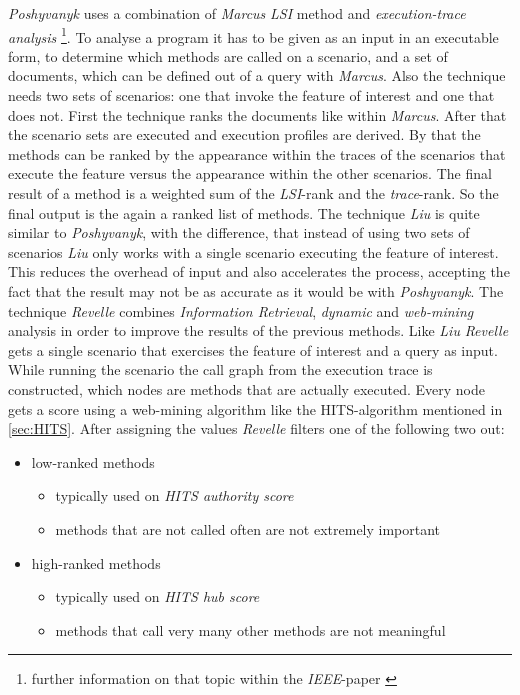\textit{Poshyvanyk} uses a combination of \textit{Marcus} \textit{LSI} method and \textit{execution-trace analysis} \footnote{further information on that topic within the \textit{IEEE}-paper \cite{antoniol2006feature}}. To analyse a program it has to be given as an input in an executable form, to determine which methods are called on a scenario, and a set of documents, which can be defined out of a query with \textit{Marcus}. Also the technique needs two sets of scenarios: one that invoke the feature of interest and one that does not. First the technique ranks the documents like within \textit{Marcus}. After that the scenario sets are executed and execution profiles are derived. By that the methods can be ranked by the appearance within the traces of the scenarios that execute the feature versus the appearance within the other scenarios. The final result of a method is a weighted sum of the \textit{LSI}-rank and the \textit{trace}-rank. So the final output is the again a ranked list of methods. \cite{poshyvanyk2007feature} \newline
The technique \textit{Liu} is quite similar to \textit{Poshyvanyk}, with the difference, that instead of using two sets of scenarios \textit{Liu} only works with a single scenario executing the feature of interest. This reduces the overhead of input and also accelerates the process, accepting the fact that the result may not be as accurate as it would be with \textit{Poshyvanyk}. \cite{liu2007feature} \newline
The technique \textit{Revelle} combines \textit{Information Retrieval}, \textit{dynamic} and \textit{web-mining} analysis in order to improve the results of the previous methods. Like \textit{Liu} \textit{Revelle} gets a single scenario that exercises the feature of interest and a query as input. While running the scenario the call graph from the execution trace is constructed, which nodes are methods that are actually executed. Every node gets a score using a web-mining algorithm like the HITS-algorithm mentioned in \autoref{sec:HITS}. After assigning the values \textit{Revelle} filters one of the following two out:
\begin{itemize}
	\item low-ranked methods 
	\begin{itemize}
		\item typically used on \textit{HITS authority score}
		\item methods that are not called often are not extremely important
	\end{itemize}
	\item high-ranked methods 
	\begin{itemize}
		\item typically used on \textit{HITS hub score}
		\item  methods that call very many other methods are not meaningful
	\end{itemize}
\end{itemize} 
